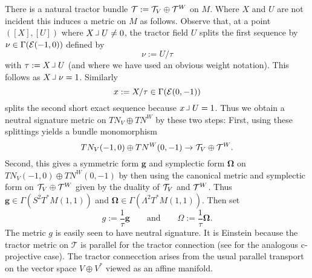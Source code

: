 There is a natural tractor bundle $\mathcal{T}:=\mathcal{T}_V\oplus \mathcal{T}^W $ on $M$. 
Where $X$ and $U$ are not incident this induces a metric on $M$ as
follows. Observe that, at a point $([X],[U])$ where $X\hook U \neq 0$, the  tractor field  $U$ splits the first sequence by $\nu\in \Gamma (\mathcal{E}(-1,0))$ defined by
$$
\nu:=U/\tau
$$
with $\tau:=X\hook U$ (and where we have used an obvious weight
notation). This follows as $X\hook \nu=1$. Similarly
$$
x:=X/\tau \in \Gamma (\mathcal{E}(0,-1))
$$
splits the second short exact sequence because $x \hook U=1$. Thus we
obtain a neutral signature metric on $TN_V\oplus TN^W$ by these
two steps: First, using  these splittings yields a bundle
monomorphism
$$
TN_V(-1,0)\oplus TN^W(0,-1) \to \mathcal{T}_V\oplus \mathcal{T}^W .
$$ Second, this gives a symmetric form $\boldsymbol{g}$ and symplectic form
$\boldsymbol{\Omega}$ on $TN_V(-1,0)\oplus TN^W(0,-1)$ by then using
the canonical metric and symplectic form on $\mathcal{T}_V\oplus \mathcal{T}^W $ given
by the duality of $\mathcal{T}_V$ and $ \mathcal{T}^W$. Thus $\boldsymbol{g}\in \Gamma
(S^2T^*M(1,1))$ and $\boldsymbol{\Omega}\in \Gamma
(\Lambda^2T^*M(1,1))$. Then set
$$ g:=\frac{1}{\tau}\boldsymbol{g} \qquad \mbox{and} \qquad  \Omega:=\frac{1}{\tau}\boldsymbol{\Omega}.
$$
The metric $g$ is easily seen to have neutral signature.  It is
Einstein because the tractor metric on $\mathcal{T}$ is parallel for the
tractor connection (see \cite{CGH-duke} for the analogous c-projective
case). The tractor connecction arises from the usual parallel transport on the
vector space $V\oplus V^*$ viewed as an affine manifold.

